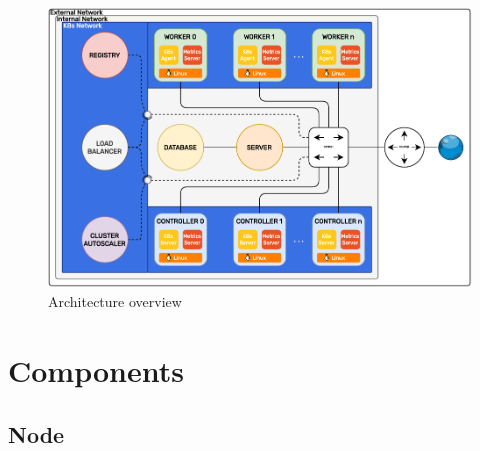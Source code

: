 \begin{figure}[htbp]
  \centering
  \vspace{.5em}
  \includegraphics[width=.9\textwidth]{images/architecture/architecture.pdf}
  \caption{Architecture overview}
  \label{fig:architecture}
\end{figure}

\section{Components}
\label{sec:architecture_components}

\subsection{Node}
\label{subsec:architecture_components_node}

